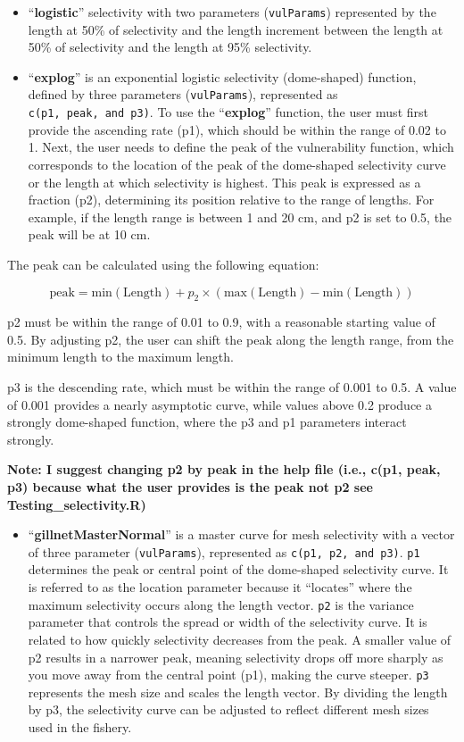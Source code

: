 \documentclass[
]{book}
\providecommand{\tightlist}{%
  \setlength{\itemsep}{0pt}\setlength{\parskip}{0pt}}
\begin{document}
\begin{itemize}
\item
  ``\textbf{logistic}'' selectivity with two parameters (\texttt{vulParams}) represented by the length at 50\% of selectivity and the length increment between the length at 50\% of selectivity and the length at 95\% selectivity.
\item
  ``\textbf{explog}'' is an exponential logistic selectivity (dome-shaped) function, defined by three parameters (\texttt{vulParams}), represented as \texttt{c(p1,\ peak,\ and\ p3)}. To use the ``\textbf{explog}'' function, the user must first provide the ascending rate (p1), which should be within the range of 0.02 to 1. Next, the user needs to define the peak of the vulnerability function, which corresponds to the location of the peak of the dome-shaped selectivity curve or the length at which selectivity is highest. This peak is expressed as a fraction (p2), determining its position relative to the range of lengths. For example, if the length range is between 1 and 20 cm, and p2 is set to 0.5, the peak will be at 10 cm.
\end{itemize}

The peak can be calculated using the following equation:

\[
\text{peak} = \text{min}(\text{Length}) + p_2 \times (\text{max}(\text{Length}) - \text{min}(\text{Length}))
\]

p2 must be within the range of 0.01 to 0.9, with a reasonable starting value of 0.5. By adjusting p2, the user can shift the peak along the length range, from the minimum length to the maximum length.

p3 is the descending rate, which must be within the range of 0.001 to 0.5. A value of 0.001 provides a nearly asymptotic curve, while values above 0.2 produce a strongly dome-shaped function, where the p3 and p1 parameters interact strongly.

\textbf{Note: I suggest changing p2 by peak in the help file (i.e., c(p1, peak, p3) because what the user provides is the peak not p2 see Testing\_selectivity.R)}

\begin{itemize}
\tightlist
\item
  ``\textbf{gillnetMasterNormal}'' is a master curve for mesh selectivity with a vector of three parameter (\texttt{vulParams}), represented as \texttt{c(p1,\ p2,\ and\ p3)}. \texttt{p1} determines the peak or central point of the dome-shaped selectivity curve. It is referred to as the location parameter because it ``locates'' where the maximum selectivity occurs along the length vector. \texttt{p2} is the variance parameter that controls the spread or width of the selectivity curve. It is related to how quickly selectivity decreases from the peak. A smaller value of p2 results in a narrower peak, meaning selectivity drops off more sharply as you move away from the central point (p1), making the curve steeper. \texttt{p3} represents the mesh size and scales the length vector. By dividing the length by p3, the selectivity curve can be adjusted to reflect different mesh sizes used in the fishery.
\end{itemize}
\end{document}
